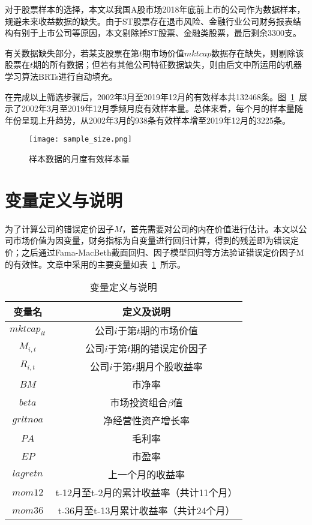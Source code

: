 对于股票样本的选择，本文以我国A股市场2018年底前上市的公司作为数据样本，规避未来收益数据的缺失。由于ST股票存在退市风险、金融行业公司财务报表结构有别于上市公司等原因，本文剔除掉ST股票、金融类股票，最后剩余3300支。

有关数据缺失部分，若某支股票在第$t$期市场价值$mktcap$数据存在缺失，则剔除该股票在$t$期的所有数据；但若有其他公司特征数据缺失，则由后文中所运用的机器学习算法BRTs进行自动填充。

在完成以上筛选步骤后，2002年3月至2019年12月的有效样本共132468条。图~\ref{size}~展示了2002年3月至2019年12月季频月度有效样本量。总体来看，每个月的样本量随年份呈现上升趋势，从2002年3月的938条有效样本增至2019年12月的3225条。

\begin{figure}[htbp]
  \centering
    \texttt{[image: sample\_size.png]}
    \caption{样本数据的月度有效样本量}
    \label{size}
\end{figure}

\section{变量定义与说明}
为了计算公司的错误定价因子$M$，首先需要对公司的内在价值进行估计。本文以公司市场价值为因变量，财务指标为自变量进行回归计算，得到的残差即为错误定价；之后通过Fama-MacBeth截面回归、因子模型回归等方法验证错误定价因子M的有效性。文章中采用的主要变量如表~\ref{variable}~所示。
\begin{table}[htbp]
  \centering
  \caption{变量定义与说明}
  \label{variable}
  \begin{tabular*}{0.9\hsize}{@{\hskip\tabcolsep\extracolsep\fill}*{2}{c}}
    \toprule
    变量名 & 定义及说明   \\
    \midrule
   $ mktcap_{it} $  & 公司$i$于第$t$期的市场价值  \\
   $M_{i, t}$  & 公司$i$于第$t$期的错误定价因子  \\
    $R_{i, t}$  &公司$i$于第$t$期月个股收益率  \\
    $BM$ & 市净率\\
    $beta $  & 市场投资组合$\beta$值 \\
    $grltnoa$ & 净经营性资产增长率\\
    $PA  $   & 毛利率\\
    $EP$   & 市盈率 \\
    $lagretn$ &上一个月的收益率\\
    $mom12$ &t-12月至t-2月的累计收益率（共计11个月） \\
    $mom36$ & t-36月至t-13月累计收益率（共计24个月）\\
          \bottomrule
  \end{tabular*}
\end{table}

